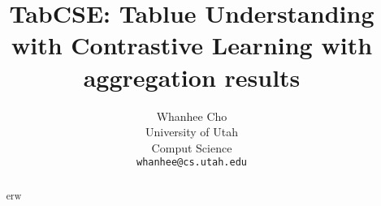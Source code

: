\documentclass[11pt]{article}
\title{TabCSE: Tablue Understanding with Contrastive Learning with aggregation results}
\author{Whanhee Cho \\
  University of Utah \\
  Comput Science \\
  \texttt{whanhee@cs.utah.edu} \\}
\begin{document}
\maketitle
\begin{abstract}
  erw
\end{abstract}









\end{document}
